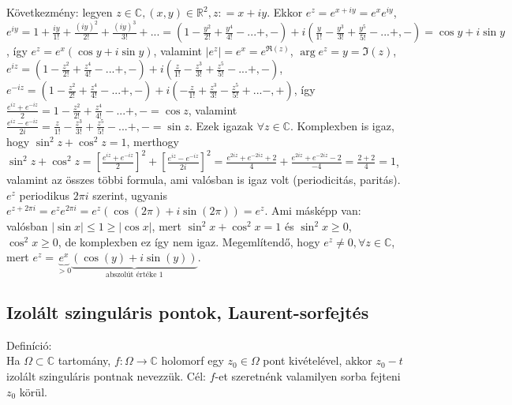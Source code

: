 \documentclass[12pt,a4paper]{scrartcl}
\newenvironment{definicio}{}{}
\begin{document}
Következmény: legyen
\(z \in {\mathbb{C}},\left( {x,y} \right) \in {\mathbb{R}}^{2},z: = x + iy\).
Ekkor \(e^{z} = e^{x + iy} = e^{x}e^{iy}\),
\(e^{iy} = 1 + \frac{iy}{1!} + \frac{\left( {iy} \right)^{2}}{2!} + \frac{\left( {iy} \right)^{3}}{3!} + ... = \left( {1 - \frac{y^{2}}{2!} + \frac{y^{4}}{4!} - ... + , -} \right) + i\left( {\frac{y}{1!} - \frac{y^{3}}{3!} + \frac{y^{5}}{5!} - ... + , -} \right) = \cos y + i\sin y\),
így \(e^{z} = e^{x}\left( {\cos y + i\sin y} \right)\), valamint
\(\left| e^{z} \right| = e^{x} = e^{\Re{(z)}}\),
\(\arg e^{z} = y = \Im\left( z \right)\),
\(e^{iz} = \left( {1 - \frac{z^{2}}{2!} + \frac{z^{4}}{4!} - ... + , -} \right) + i\left( {\frac{z}{1!} - \frac{z^{3}}{3!} + \frac{z^{5}}{5!} - ... + , -} \right)\),
\(e^{- iz} = \left( {1 - \frac{z^{2}}{2!} + \frac{z^{4}}{4!} - ... + , -} \right) + i\left( {- \frac{z}{1!} + \frac{z^{3}}{3!} - \frac{z^{5}}{5!} + ... - , +} \right)\),
így
\(\frac{e^{iz} + e^{- iz}}{2} = 1 - \frac{z^{2}}{2!} + \frac{z^{4}}{4!} - ... + , - = \cos z\),
valamint
\(\frac{e^{iz} - e^{- iz}}{2i} = \frac{z}{1!} - \frac{z^{3}}{3!} + \frac{z^{5}}{5!} - ... + , - = \sin z\).
Ezek igazak \(\forall z \in {\mathbb{C}}\). Komplexben is igaz, hogy
\(\sin^{2}z + \cos^{2}z = 1\), merthogy
\(\sin^{2}z + \cos^{2}z = \left\lbrack \frac{e^{iz} + e^{- iz}}{2} \right\rbrack^{2} + \left\lbrack \frac{e^{iz} - e^{- iz}}{2i} \right\rbrack^{2} = \frac{e^{2iz} + e^{- 2iz} + 2}{4} + \frac{e^{2iz} + e^{- 2iz} - 2}{- 4} = \frac{2 + 2}{4} = 1\),
valamint az összes többi formula, ami valósban is igaz volt
(periodicitás, paritás). \(e^{z}\) periodikus \(2\pi i\) szerint,
ugyanis
\(e^{z + 2\pi i} = e^{z}e^{2\pi i} = e^{z}\left( {\cos\left( {2\pi} \right) + i\sin\left( {2\pi} \right)} \right) = e^{z}\).
Ami másképp van: valósban
\(\left| {\sin x} \right| \leq 1 \geq \left| {\cos x} \right|\), mert
\(\sin^{2}x + \cos^{2}x = 1\) és \(\sin^{2}x \geq 0\),
\(\cos^{2}x \geq 0\), de komplexben ez így nem igaz. Megemlítendő, hogy
\(e^{z} \neq 0,\forall z \in {\mathbb{C}}\), mert
\({e^z} = \underbrace {{e^x}}_{ > 0}\underbrace {\left( {\cos \left( y \right) + i\sin \left( y \right)} \right)}_{{\text{abszolút értéke 1}}}\).

\hypertarget{izolalt-szingularis-pontok-laurent-sorfejtes}{%
\subsection{Izolált szinguláris pontok,
Laurent-sorfejtés}\label{izolalt-szingularis-pontok-laurent-sorfejtes}}

\begin{definicio}

Definíció:\\
Ha \(\Omega \subset {\mathbb{C}}\) tartomány,
\(\left. f:\Omega\rightarrow{\mathbb{C}} \right.\) holomorf egy
\(z_{0} \in \Omega\) pont kivételével, akkor \(z_{0} - t\) izolált
szinguláris pontnak nevezzük. Cél: \(f\)-et szeretnénk valamilyen sorba
fejteni \(z_{0}\) körül.

\end{definicio}
\end{document}
